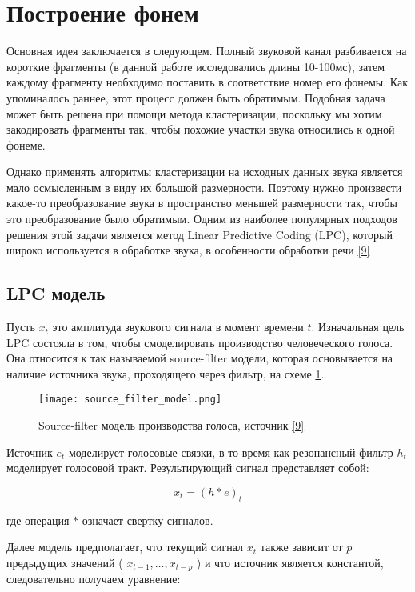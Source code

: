 \documentclass[a4paper,14pt]{extarticle}
\begin{document}
\section{Построение фонем}
Основная идея заключается в следующем. Полный звуковой канал разбивается на короткие фрагменты (в данной работе исследовались длины 10-100мс), затем каждому фрагменту необходимо поставить в соответствие номер его фонемы. Как упоминалось раннее, этот процесс должен быть обратимым. Подобная задача может быть решена при помощи метода кластеризации, поскольку мы хотим закодировать фрагменты так, чтобы похожие участки звука относились к одной фонеме.

Однако применять алгоритмы кластеризации на исходных данных звука является мало осмысленным в виду их большой размерности. Поэтому нужно произвести какое-то преобразование звука в пространство меньшей размерности так, чтобы это преобразование было обратимым. Одним из наиболее популярных подходов решения этой задачи является метод Linear Predictive Coding (LPC), который широко используется в обработке звука, в особенности обработки речи \hyperlink{b_9}{[9]}

\subsection{LPC модель}
Пусть $x_t$ это амплитуда звукового сигнала в момент времени $t$. Изначальная цель LPC состояла в том, чтобы смоделировать производство человеческого голоса. Она относится к так называемой source-filter модели, которая основывается на наличие источника звука, проходящего через фильтр, на схеме \ref{fig:source_filter_model}.

\begin{figure}[H]
	\centering
	\texttt{[image: source\_filter\_model.png]}
	\caption{Source-filter модель производства голоса, источник \protect\hyperlink{b_9}{[9]} }
	\label{fig:source_filter_model}
\end{figure}

Источник $e_t$ моделирует голосовые связки, в то время как резонансный фильтр $h_t$ моделирует голосовой тракт. Результирующий сигнал представляет собой:

$$x_t = (h * e)_t$$

где операция $*$ означает свертку сигналов.

Далее модель предполагает, что текущий сигнал $x_t$ также зависит от $p$ предыдущих значений ( $x_{t-1}, \dots, x_{t-p}$ ) и что источник является константой, следовательно получаем уравнение:
\end{document}
